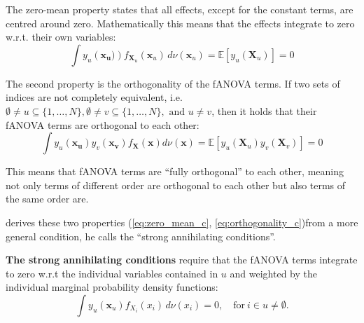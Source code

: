 \begin{proposition}
    The zero-mean property states that all effects, except for the constant terms, are centred around zero.
Mathematically this means that the effects integrate to zero w.r.t. their own variables:
\begin{equation}
    \int y_u(\boldsymbol{x_u)}) f_{\boldsymbol{X}_u}(\boldsymbol{x}_u) \, d\nu (\boldsymbol{x}_u) = \mathbb{E}[y_u(\boldsymbol{X}_u)] = 0
    \label{eq:zero_mean_c}
\end{equation}
\end{proposition}
\begin{proposition}
    The second property is the orthogonality of the fANOVA terms. If two sets of indices are not completely equivalent, i.e. $\emptyset \neq u \subseteq \{1, \dots, N\}, \emptyset \neq v \subseteq \{1, \dots, N\}, \text{ and } u \neq v$, then it holds that their fANOVA terms are orthogonal to each other:
\begin{equation}
    \int y_u(\boldsymbol{x_u}) y_v(\boldsymbol{x_v}) f_{\boldsymbol{X}}(\boldsymbol{x}) d\nu (\boldsymbol{x}) = \mathbb{E}[y_u(\boldsymbol{X}_u) y_v(\boldsymbol{X}_v)] = 0
    \label{eq:orthogonality_c}
\end{equation}
\end{proposition}
This means that fANOVA terms are ``fully orthogonal'' to each other, meaning not only terms of different order are orthogonal to each other but also terms of the same order are.\par

\cite{rahman2014} derives these two properties (\autoref{eq:zero_mean_c}, \autoref{eq:orthogonality_c})from a more general condition, he calls the ``strong annihilating conditions''.\par
\textbf{The strong annihilating conditions} require that the fANOVA terms integrate to zero w.r.t the individual variables contained in $u$ and weighted by the individual marginal probability density functions:
\begin{equation}
    \int y_u(\boldsymbol{x}_u) f_{X_i}(x_i) \, d\nu(x_i) = 0, \quad \text{for} \ i \in u \neq \emptyset.
    \label{eq:strong_annihilating_conditions}
\end{equation}

